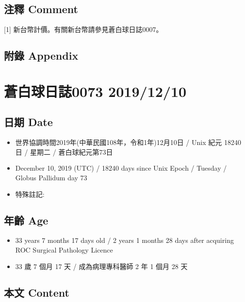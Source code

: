 \documentclass[
]{article}
\providecommand{\tightlist}{%
  \setlength{\itemsep}{0pt}\setlength{\parskip}{0pt}}
\begin{document}
\hypertarget{ux6ce8ux91cb-comment-8}{%
\subsection{注釋 Comment}\label{ux6ce8ux91cb-comment-8}}

{[}1{]} 新台幣計價。有關新台幣請參見蒼白球日誌0007。

\hypertarget{ux9644ux9304-appendix-8}{%
\subsection{附錄 Appendix}\label{ux9644ux9304-appendix-8}}

\hypertarget{ux84bcux767dux7403ux65e5ux8a8c0073-20191210}{%
\section{蒼白球日誌0073
2019/12/10}\label{ux84bcux767dux7403ux65e5ux8a8c0073-20191210}}

\hypertarget{ux65e5ux671f-date-9}{%
\subsection{日期 Date}\label{ux65e5ux671f-date-9}}

\begin{itemize}
\tightlist
\item
  世界協調時間2019年(中華民國108年，令和1年)12月10日 / Unix 紀元 18240
  日 / 星期二 / 蒼白球紀元第73日
\item
  December 10, 2019 (UTC) / 18240 days since Unix Epoch / Tuesday /
  Globus Pallidum day 73
\item
  特殊註記:
\end{itemize}

\hypertarget{ux5e74ux9f61-age-9}{%
\subsection{年齡 Age}\label{ux5e74ux9f61-age-9}}

\begin{itemize}
\tightlist
\item
  33 years 7 months 17 days old / 2 years 1 months 28 days after
  acquiring ROC Surgical Pathology Licence
\item
  33 歲 7 個月 17 天 / 成為病理專科醫師 2 年 1 個月 28 天
\end{itemize}

\hypertarget{ux672cux6587-content-9}{%
\subsection{本文 Content}\label{ux672cux6587-content-9}}
\end{document}
